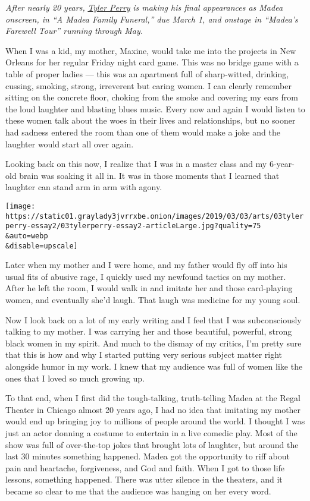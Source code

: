 \emph{After nearly 20 years,}
\href{https://www.nytimes3xbfgragh.onion/topic/person/tyler-perry}{\emph{Tyler
Perry}} \emph{is making his final appearances as Madea onscreen, in ``A
Madea Family Funeral,'' due March 1, and onstage in ``Madea's Farewell
Tour'' running through May.}

When I was a kid, my mother, Maxine, would take me into the projects in
New Orleans for her regular Friday night card game. This was no bridge
game with a table of proper ladies --- this was an apartment full of
sharp-witted, drinking, cussing, smoking, strong, irreverent but caring
women. I can clearly remember sitting on the concrete floor, choking
from the smoke and covering my ears from the loud laughter and blasting
blues music. Every now and again I would listen to these women talk
about the woes in their lives and relationships, but no sooner had
sadness entered the room than one of them would make a joke and the
laughter would start all over again.

Looking back on this now, I realize that I was in a master class and my
6-year-old brain was soaking it all in. It was in those moments that I
learned that laughter can stand arm in arm with agony.

\texttt{[image: https://static01.graylady3jvrrxbe.onion/images/2019/03/03/arts/03tylerperry-essay2/03tylerperry-essay2-articleLarge.jpg?quality=75\\\&auto=webp\\\&disable=upscale]}

Later when my mother and I were home, and my father would fly off into
his usual fits of abusive rage, I quickly used my newfound tactics on my
mother. After he left the room, I would walk in and imitate her and
those card-playing women, and eventually she'd laugh. That laugh was
medicine for my young soul.

Now I look back on a lot of my early writing and I feel that I was
subconsciously talking to my mother. I was carrying her and those
beautiful, powerful, strong black women in my spirit. And much to the
dismay of my critics, I'm pretty sure that this is how and why I started
putting very serious subject matter right alongside humor in my work. I
knew that my audience was full of women like the ones that I loved so
much growing up.

To that end, when I first did the tough-talking, truth-telling Madea at
the Regal Theater in Chicago almost 20 years ago, I had no idea that
imitating my mother would end up bringing joy to millions of people
around the world. I thought I was just an actor donning a costume to
entertain in a live comedic play. Most of the show was full of
over-the-top jokes that brought lots of laughter, but around the last 30
minutes something happened. Madea got the opportunity to riff about pain
and heartache, forgiveness, and God and faith. When I got to those life
lessons, something happened. There was utter silence in the theaters,
and it became so clear to me that the audience was hanging on her every
word.

